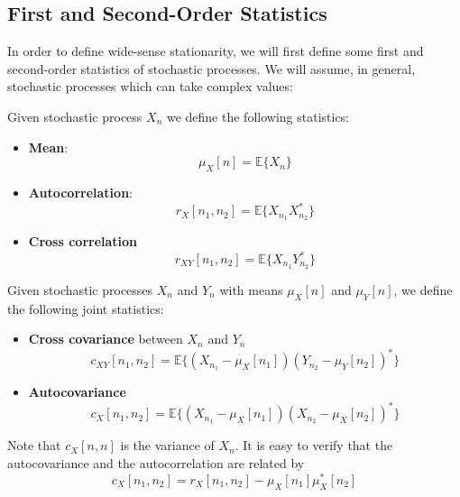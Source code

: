 \subsection{First and Second-Order Statistics}
\label{sec:CaracterizProcStoc}

In order to define wide-sense stationarity, we will first define some first and second-order statistics of stochastic processes. We will assume, in general, stochastic processes which can take complex values:


\begin{definition}
Given stochastic process $X_n$ we define the following statistics:

\begin{itemize}
\item \textbf{Mean}:
\begin{equation}\label{ec:DefMediaProcCont}
  \mu_X[n] = \mathbb{E}\{X_n\}
\end{equation}
\item \textbf{Autocorrelation}:
\begin{equation}
r_X[n_1,n_2] = \mathbb{E}\{X_{n_1}X^*_{n_2}\}
\label{ec:autocorr}
\end{equation}
\item \textbf{Cross correlation}
\begin{equation}
r_{XY}[n_1,n_2] = \mathbb{E}\{X_{n_1}Y^*_{n_2}\}
\end{equation}
\end{itemize}

Given stochastic processes $X_n$ and $Y_n$ with means $\mu_X[n]$ and $\mu_Y[n]$, we define the following joint statistics:
\begin{itemize}
\item \textbf{Cross covariance} between $X_n$ and $Y_n$
\begin{equation}
c_{XY}[n_1,n_2] = \mathbb{E}\{(X_{n_1}- \mu_X[n_1]) (Y_{n_2}-\mu_Y[n_2])^*\}
\end{equation}
\item \textbf{Autocovariance}
\begin{equation}
c_X[n_1,n_2] = \mathbb{E}\{(X_{n_1}- \mu_X[n_1]) (X_{n_2}- \mu_X[n_2])^*\}
\end{equation}
\end{itemize}
\end{definition}

Note that $c_X[n, n]$ is the variance of $X_n$. It is easy to verify that the autocovariance and the autocorrelation are related by
\begin{equation}
c_X[n_1,n_2] = r_X[n_1,n_2] - \mu_X[n_1] \mu_X^*[n_2]
\label{SP:cx_vs_rx}
\end{equation}

